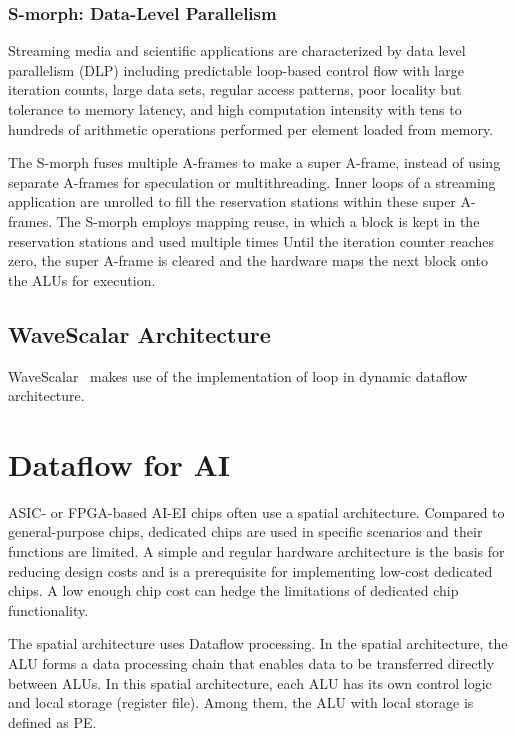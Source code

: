 \documentclass[UTF8,12pt,a4paper]{article}
\begin{document}
\subsubsection{S-morph: Data-Level Parallelism}
Streaming media and scientific applications are characterized by data level parallelism (DLP)
including predictable loop-based control flow with large iteration counts,
large data sets, regular access patterns, poor locality but tolerance to memory latency,
and high computation intensity with tens to hundreds of arithmetic operations performed per element loaded from memory.

The S-morph fuses multiple A-frames to make a super A-frame,
instead of using separate A-frames for speculation or multithreading.
Inner loops of a streaming application are unrolled
to fill the reservation stations within these super A-frames.
The S-morph employs mapping reuse, in which a block is kept in the reservation stations and used multiple times
Until the iteration counter reaches zero, the super A-frame is cleared
and the hardware maps the next block onto the ALUs for execution.

\subsection{WaveScalar Architecture}

WaveScalar~\cite{DBLP:conf/micro/SwansonMSO03}\cite{DBLP:journals/tocs/SwansonSMPPMOE07}
makes use of the implementation of loop in dynamic dataflow architecture.

\clearpage

\section{Dataflow for AI}

ASIC- or FPGA-based AI-EI chips often use a spatial architecture.
Compared to general-purpose chips, dedicated chips are used
in specific scenarios and their functions are limited.
A simple and regular hardware architecture is the basis for reducing design costs
and is a prerequisite for implementing low-cost dedicated chips.
A low enough chip cost can hedge the limitations of dedicated chip functionality.

The spatial architecture uses Dataflow processing.
In the spatial architecture, the ALU forms a data processing chain
that enables data to be transferred directly between ALUs.
In this spatial architecture, each ALU has its own control logic and local storage (register file).
Among them, the ALU with local storage is defined as PE.
\end{document}
